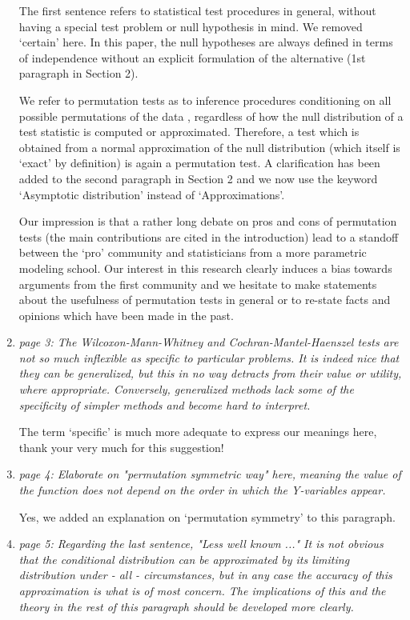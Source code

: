 \documentclass[11pt]{article}
\begin{document}
\begin{enumerate}
The first sentence refers to statistical test procedures in general,
without having a special test problem or null hypothesis in mind. We removed
`certain' here. In this paper, the null hypotheses are always defined in
terms of independence without an explicit formulation of the alternative
(1st paragraph in Section 2).

We refer to permutation tests as to inference procedures conditioning on all
possible permutations of the data \citep[in the sense
of][]{edgington1987,good2000,pesarin2001,ernst2004},
regardless of how the null distribution of a test
statistic is computed or approximated. Therefore, a test which is obtained
from a normal approximation of the null distribution (which itself is
`exact' by definition) is again a permutation test. A clarification has been
added to the second paragraph in Section 2 and we now use the keyword 
`Asymptotic distribution' instead of `Approximations'.

Our impression is that a rather long debate on pros and cons of permutation
tests (the main contributions are cited in the introduction) lead to a standoff
between the `pro' community and statisticians from a more parametric
modeling school. Our interest in this research clearly induces a bias
towards arguments from the first community and we hesitate to make
statements about the usefulness of permutation tests in general or to
re-state facts and opinions which have been made in the past.

\item \textsl{page 3:  The Wilcoxon-Mann-Whitney and Cochran-Mantel-Haenszel tests are not 
              so much inflexible as specific to particular problems. It is indeed nice that they 
              can be generalized, but this in no way detracts from their value or utility, where 
              appropriate. Conversely, generalized methods lack some of the specificity of 
              simpler methods and become hard to interpret.}

The term `specific' is much more adequate to express our meanings here,
thank your very much for this suggestion! 

\item \textsl{page 4:  Elaborate on "permutation symmetric way" here, meaning the value of the 
              function does not depend on the order in which the Y-variables appear.}

Yes, we added an explanation on `permutation
symmetry' to this paragraph.
 
\item \label{asympt} \textsl{page 5:  Regarding the last sentence, "Less well known ..." It is not obvious that 
              the conditional distribution can be approximated by its limiting distribution 
              under - all - circumstances, but in any case the accuracy of this approximation 
              is what is of most concern. The implications of this and the theory in the rest of 
              this paragraph should be developed more clearly. }


\end{enumerate}
\end{document}
